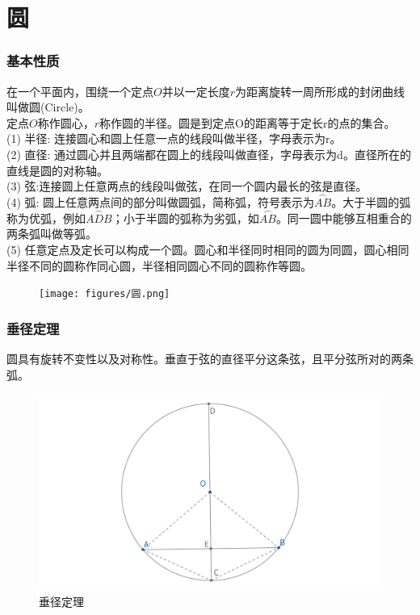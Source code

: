 \part{圆}
\section{基本性质}
\begin{definition}[圆]
    在一个平面内，围绕一个定点$O$并以一定长度$r$为距离旋转一周所形成的封闭曲线叫做圆(Circle)。\\
    定点$O$称作圆心，$r$称作圆的半径。圆是到定点O的距离等于定长r的点的集合。\\
    (1) 半径: 连接圆心和圆上任意一点的线段叫做半径，字母表示为r。\\
    (2) 直径: 通过圆心并且两端都在圆上的线段叫做直径，字母表示为d。直径所在的直线是圆的对称轴。\\
    (3) 弦:连接圆上任意两点的线段叫做弦，在同一个圆内最长的弦是直径。\\
    (4) 弧: 圆上任意两点间的部分叫做圆弧，简称弧，符号表示为$\overset{\frown}{AB}$。大于半圆的弧称为优弧，例如$\overset{\frown}{ADB}$；小于半圆的弧称为劣弧，如$\overset{\frown}{AB}$。同一圆中能够互相重合的两条弧叫做等弧。\\
    (5) 任意定点及定长可以构成一个圆。圆心和半径同时相同的圆为同圆，圆心相同半径不同的圆称作同心圆，半径相同圆心不同的圆称作等圆。\\
\end{definition}

\begin{figure}[H]
    \centering
    \texttt{[image: figures/圆.png]}
\end{figure}


\newpage 
\section{垂径定理}
\begin{theorem}[垂径定理]
圆具有旋转不变性以及对称性。垂直于弦的直径平分这条弦，且平分弦所对的两条弧。
\end{theorem}
\begin{figure}[H]
    \centering
    \includegraphics[width=\linewidth]{figures/垂径定理.png}
    \caption{垂径定理}
\end{figure}



